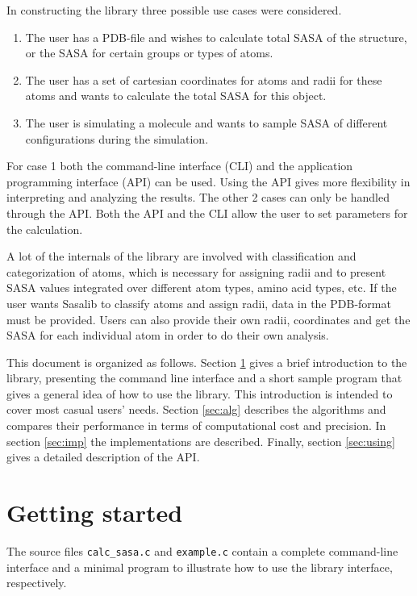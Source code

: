 \documentclass[a4paper,11pt]{article}
\begin{document}
In constructing the library three possible use cases were considered. 
\begin{enumerate}
\item The user has a PDB-file and wishes to calculate total SASA of
  the structure, or the SASA for certain groups or types of atoms.
\item The user has a set of cartesian coordinates for atoms and radii
  for these atoms and wants to calculate the total SASA for this object. 
\item The user is simulating a molecule and wants to sample SASA of
  different configurations during the simulation.
\end{enumerate}
For case 1 both the command-line interface (CLI) and the application
programming interface (API) can be used. Using the API gives more
flexibility in interpreting and analyzing the results. The other 2
cases can only be handled through the API. Both the API and the CLI
allow the user to set parameters for the calculation. 

A lot of the internals of the library are involved with classification
and categorization of atoms, which is necessary for assigning radii
and to present SASA values integrated over different atom types, amino
acid types, etc. If the user wants Sasalib to classify atoms and
assign radii, data in the PDB-format must be provided. Users can also
provide their own radii, coordinates and get the SASA for each
individual atom in order to do their own analysis.

This document is organized as follows. Section \ref{sec:howto_short}
gives a brief introduction to the library, presenting the command line
interface and a short sample program that gives a general idea of how
to use the library. This introduction is intended to cover most casual
users' needs. Section \ref{sec:alg} describes the algorithms and
compares their performance in terms of computational cost and
precision. In section \ref{sec:imp} the implementations are
described. Finally, section \ref{sec:using} gives a detailed
description of the API.

\section{Getting started}\label{sec:howto_short}

The source files \texttt{calc\_sasa.c} and \texttt{example.c} contain
a complete command-line interface and a minimal program to illustrate
how to use the library interface, respectively. 
\end{document}
